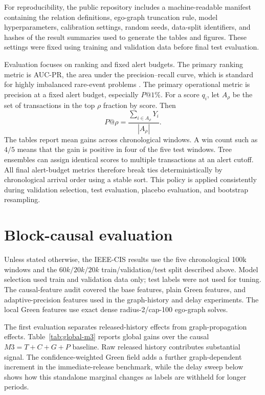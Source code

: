 \documentclass[11pt]{article}
\theoremstyle{definition}
\theoremstyle{remark}
\begin{document}
For reproducibility, the public repository includes a machine-readable manifest containing the relation definitions, ego-graph truncation rule, model hyperparameters, calibration settings, random seeds, data-split identifiers, and hashes of the result summaries used to generate the tables and figures. These settings were fixed using training and validation data before final test evaluation.

Evaluation focuses on ranking and fixed alert budgets. The primary ranking metric is AUC-PR, the area under the precision--recall curve, which is standard for highly imbalanced rare-event problems \cite{davis2006relationship,saito2015precision}. The primary operational metric is precision at a fixed alert budget, especially $P@1\%$. For a score $q_i$, let $A_\rho$ be the set of transactions in the top $\rho$ fraction by score. Then
\[
    P@\rho=\frac{\sum_{i\in A_\rho}Y_i}{|A_\rho|}.
\]
The tables report mean gains across chronological windows. A win count such as $4/5$ means that the gain is positive in four of the five test windows.
Tree ensembles can assign identical scores to multiple transactions at an alert cutoff. All final alert-budget metrics therefore break ties deterministically by chronological arrival order using a stable sort. This policy is applied consistently during validation selection, test evaluation, placebo evaluation, and bootstrap resampling.


\section{Block-causal evaluation}
\label{sec:results}

Unless stated otherwise, the IEEE-CIS results use the five chronological 100k windows and the $60k/20k/20k$ train/validation/test split described above. Model selection used train and validation data only; test labels were not used for tuning. The causal-feature audit covered the base features, plain Green features, and adaptive-precision features used in the graph-history and delay experiments. The local Green features use exact dense radius-2/cap-100 ego-graph solves.

The first evaluation separates released-history effects from graph-propagation effects. Table~\ref{tab:global-m3} reports global gains over the causal $M3=T+C+G+P$ baseline. Raw released history contributes substantial signal. The confidence-weighted Green field adds a further graph-dependent increment in the immediate-release benchmark, while the delay sweep below shows how this standalone marginal changes as labels are withheld for longer periods.
\end{document}
